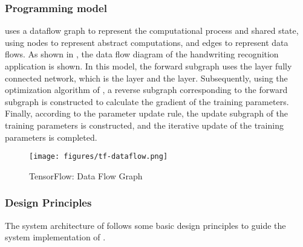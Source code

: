 \begin{content}
\subsubsection{Programming model}
 uses a dataflow graph to represent the computational process and shared state, using nodes to represent abstract computations, and edges to represent data flows. As shown in , the data flow diagram of the  handwriting recognition application is shown. In this model, the forward subgraph uses the  layer fully connected network, which is the  layer and the  layer. Subsequently, using the optimization algorithm of , a reverse subgraph corresponding to the forward subgraph is constructed to calculate the gradient of the training parameters. Finally, according to the parameter update rule, the update subgraph of the training parameters is constructed, and the iterative update of the training parameters is completed.
\begin{figure}[H]
  \centering
  \texttt{[image: figures/tf-dataflow.png]}
  \caption{TensorFlow: Data Flow Graph}
  \label{fig:tf-dataflow}
\end{figure}


\subsubsection{Design Principles}
The system architecture of \tf{} follows some basic design principles to guide the system implementation of \tf{}.
\begin{enum}
\end{enum}



\end{content}

